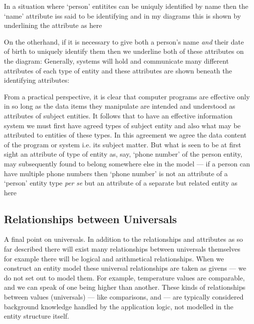 \mynote
In a situation where `person' entitites can be uniquly identified by name then the `name' attribute
iss said to be identifying and in my diagrams this is shown by underlining the attribute as here	

On the otherhand, if it is necessary to give both a person's name \textit{and} their date of birth to uniquely identify 
them  then we underline
both of these attributes on the diagram:
Generally, systems will hold and communicate many different attributes of each type of entity and
these attributes are shown beneath the identifying attributes:

\mynote 
From a practical perspective, 
it is clear that computer programs are effective only in so long as the data items 
they manipulate are intended and understood as attributes of subject entities. It 
follows that to have an effective information system we must first have agreed types 
of subject entity and also what may be attributed to entities  of these types. 
In this agreement we agree the data content of the program or system i.e.  
its subject matter. But what is seen to be at first sight an attribute of type of entity
as, say, `phone number' of the person entity,  may
subsequently found to belong somewhere else in the model  ---   if a person can have multiple phone numbers then ‘phone number’ is 
not an attribute  of a ‘person’ entity type \textit{per se} but an attribute of a 
separate but related entity as here 


\subsection{Relationships between Universals}
\mynote A final point on universals. In addition to the relationships and attributes as so far described there will exist many relationships between universals themselves
for example there will be logical and arithmetical relationships. When we construct an entity model these universal relationships are taken as givens --- we do not set out to model them.
For example, temperature values are comparable, and we can speak of one being higher than another.
 These kinds of relationships between values (universals) — like comparisons,  and
  — are typically considered background knowledge 
  handled by the application logic, not modelled in the entity structure itself.



